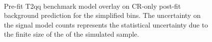 \begin{figure}[!h]
    \centering
     \\
    \caption{
        Pre-fit T2qq benchmark model overlay on CR-only post-fit
        background prediction for the simplified bins. The uncertainty on
        the signal model counts represents the statistical uncertainty due
        to the finite size of the of the simulated sample.
    }
    \label{fig:T2qq_1fold_MR_simp}
\end{figure}

